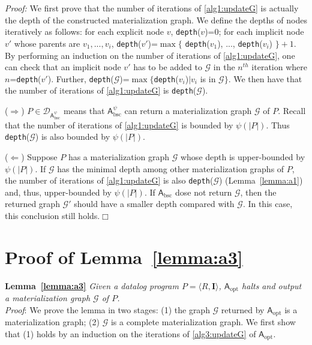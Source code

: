 \noindent\emph{Proof:} We first prove that the number of iterations of \ref{alg1:updateG}
is actually the depth of the constructed materialization graph.
We define the depths of nodes iteratively as follows:
for each explicit node $v$, \texttt{depth}($v$)=0;
for each implicit node $v'$ whose parents are $v_1,...,v_i$, \texttt{depth}($v'$)=$\max$$\{$ \texttt{depth}($v_1$), ..., \texttt{depth}($v_i$) $\}+1$.
By performing an induction on the number of iterations of \ref{alg1:updateG},
one can check that an implicit node $v'$ has to be added to $\mathcal{G}$ in the $n^{th}$ iteration
where $n$=\texttt{depth}($v'$).
Further, \texttt{depth}($\mathcal{G}$)=$\max$$\{$\texttt{depth}($v_i$)$|v_i$ is in $\mathcal{G}\}$.
We then have that the number of iterations of \ref{alg1:updateG} is \texttt{depth}($\mathcal{G}$).

($\Rightarrow$) $P\in\mathcal{D}_{\mathsf{A}_{\text{bsc}}^{\psi}}$ means that $\mathsf{A}_{\text{bsc}}^{\psi}$ can return
a materialization graph $\mathcal{G}$ of $P$.
Recall that the number of iterations of \ref{alg1:updateG} is bounded by $\psi(|P|)$.
Thus \texttt{depth}($\mathcal{G}$) is also bounded by $\psi(|P|)$.

($\Leftarrow$) Suppose $P$ has a materialization graph $\mathcal{G}$ whose depth
is upper-bounded by $\psi(|P|)$.
If $\mathcal{G}$ has the minimal depth among other materialization graphs of $P$,
the number of iterations of \ref{alg1:updateG} is also \texttt{depth}($\mathcal{G}$) (Lemma~\ref{lemma:a1})
and, thus, upper-bounded by $\psi(|P|)$.
If $\mathsf{A}_{\text{bsc}}$ dose not return $\mathcal{G}$, then the returned graph $\mathcal{G}'$
should have a smaller depth compared with $\mathcal{G}$.
In this case, this conclusion still holds.\hfill$\Box$

\section{Proof of Lemma~\ref{lemma:a3}}

\textbf{Lemma~\ref{lemma:a3}}
\emph{Given a datalog program $P=\langle R, \textbf{I}\rangle$,
$\mathsf{A}_{\text{opt}}$ halts and output a materialization graph
$\mathcal{G}$ of $P$.}\\

\noindent\emph{Proof}: We prove the lemma in two stages:
(1) the graph $\mathcal{G}$ returned by $\mathsf{A}_{\text{opt}}$ is a materialization graph;
(2) $\mathcal{G}$ is a complete materialization graph.
We first show that (1) holds by an induction on the iterations of \ref{alg3:updateG} of $\mathsf{A}_{\text{opt}}$.

